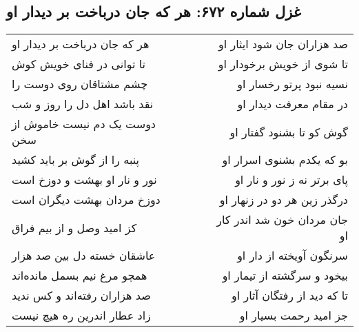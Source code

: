 \begin{center}
\section*{غزل شماره ۶۷۲: هر که جان درباخت بر دیدار او}
\label{sec:672}
\begin{longtable}{l p{0.5cm} r}
هر که جان درباخت بر دیدار او
&&
صد هزاران جان شود ایثار او
\\
تا توانی در فنای خویش کوش
&&
تا شوی از خویش برخودار او
\\
چشم مشتاقان روی دوست را
&&
نسیه نبود پرتو رخسار او
\\
نقد باشد اهل دل را روز و شب
&&
در مقام معرفت دیدار او
\\
دوست یک دم نیست خاموش از سخن
&&
گوش کو تا بشنود گفتار او
\\
پنبه را از گوش بر باید کشید
&&
بو که یکدم بشنوی اسرار او
\\
نور و نار او بهشت و دوزخ است
&&
پای برتر نه ز نور و نار او
\\
دوزخ مردان بهشت دیگران است
&&
درگذر زین هر دو در زنهار او
\\
کز امید وصل و از بیم فراق
&&
جان مردان خون شد اندر کار او
\\
عاشقان خسته دل بین صد هزار
&&
سرنگون آویخته از دار او
\\
همچو مرغ نیم بسمل مانده‌اند
&&
بیخود و سرگشته از تیمار او
\\
صد هزاران رفته‌اند و کس ندید
&&
تا که دید از رفتگان آثار او
\\
زاد عطار اندرین ره هیچ نیست
&&
جز امید رحمت بسیار او
\\
\end{longtable}
\end{center}
